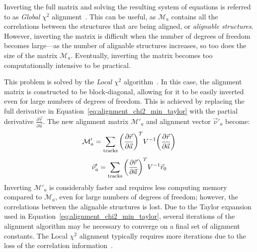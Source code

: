 Inverting the full matrix and solving the resulting system of equations is referred to as \emph{Global} $\chi^2$ alignment~\cite{2005.global-chi2-alignment}.
This can be useful, as $\mathcal{M}_a$ contains all the correlations between the structures that are being aligned, or \emph{alignable structures}.
However, inverting the matrix is difficult when the number of degrees of freedom becomes large---as the number of alignable structures increases, so too does the size of the matrix $\mathcal{M}_a$.
Eventually, inverting the matrix becomes too computationally intensive to be practical.

This problem is solved by the \emph{Local} $\chi^2$ algorithm~\cite{2005.local-chi2-thesis}.
In this case, the alignment matrix is constructed to be block-diagonal, allowing for it to be easily inverted even for large numbers of degrees of freedom.
This is achieved by replacing the full derivative in Equation~\ref{eq:alignment_chi2_min_taylor} with the partial derivative $\frac{\partial\vec{r}}{\partial\vec{a}}$.
The new alignment matrix $\mathcal{M}'_{a}$ and alignment vector $\vec{\nu}'_a$ become:
\begin{equation}
  \mathcal{M}'_a = \sum\limits_{\textrm{tracks}}\bigg(\pderiv{\vec{r}}{\vec{a}}\bigg)^{T}V^{-1}\bigg(\pderiv{\vec{r}}{\vec{a}}\bigg)
  \label{eq:alignment_matrix_local}
\end{equation}
\begin{equation}
  \vec{\nu}'_a = \sum\limits_{\textrm{tracks}}\bigg(\pderiv{\vec{r}}{\vec{a}}\bigg)^{T}V^{-1}\vec{r}_0
  \label{eq:alignment_vector_local}
\end{equation}
Inverting $\mathcal{M}'_{a}$ is considerably faster and requires less computing memory compared to $\mathcal{M}_{a}$, even for large numbers of degrees of freedom; however, the correlations between the alignable structures is lost.
Due to the Taylor expansion used in Equation~\ref{eq:alignment_chi2_min_taylor}, several iterations of the alignment algorithm may be necessary to converge on a final set of alignment constants.
The Local $\chi^2$ alignment typically requires more iterations due to the loss of the correlation information~\cite{2007.alignment-strategy}.

